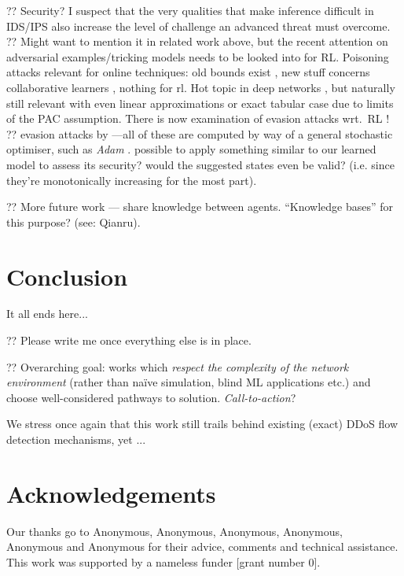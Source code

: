 \documentclass[conference, letterpaper, 10pt, times]{IEEEtran}
\begin{document}
?? Security? I suspect that the very qualities that make inference difficult in IDS/IPS also increase the level of challenge an advanced threat must overcome.
?? Might want to mention it in related work above, but the recent attention on adversarial examples/tricking models needs to be looked into for RL. Poisoning attacks relevant for online techniques: old bounds exist \textcite{DBLP:journals/jmlr/KloftL10}, new stuff concerns collaborative learners \cite{DBLP:conf/acsac/ShenTS16}, nothing for rl. Hot topic in deep networks \cite{DBLP:conf/eurosp/PapernotMJFCS16, DBLP:conf/eurosp/PapernotMSW18}, but naturally still relevant with even linear approximations or exact tabular case due to limits of the PAC assumption. There is now examination of evasion attacks wrt.\ RL \cite{DBLP:journals/corr/HuangPGDA17}!
?? evasion attacks by \textcite{DBLP:conf/sp/Carlini017}---all of these are computed by way of a general stochastic optimiser, such as \emph{Adam} \cite{DBLP:journals/corr/KingmaB14}. possible to apply something similar to our learned model to assess its security? would the suggested states even be valid? (i.e. since they're monotonically increasing for the most part).

?? More future work --- share knowledge between agents. ``Knowledge bases'' for this purpose? (see: Qianru).

\section{Conclusion}

It all ends here...

?? Please write me once everything else is in place.

?? Overarching goal: works which \emph{respect the complexity of the network environment} (rather than na\"{i}ve simulation, blind ML applications etc.) and choose well-considered pathways to solution. \emph{Call-to-action}?

We stress once again that this work still trails behind existing (exact) DDoS flow detection mechanisms, yet ...

\section*{Acknowledgements}
Our thanks go to Anonymous, Anonymous, Anonymous, Anonymous, Anonymous and Anonymous for their advice, comments and technical assistance.
This work was supported by a nameless funder [grant number 0].

\renewcommand*{\bibfont}{\small}
\printbibliography
\end{document}
